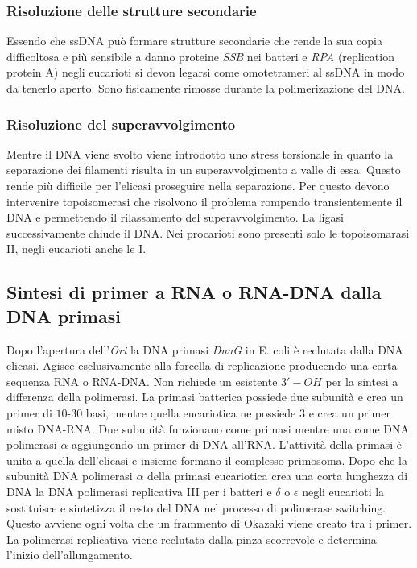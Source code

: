 \subsubsection{Risoluzione delle strutture secondarie}
Essendo che ssDNA pu\`o formare strutture secondarie che rende la sua copia difficoltosa e pi\`u sensibile a danno proteine \emph{SSB} nei batteri e \emph{RPA} (replication protein A) 
negli eucarioti si devon legarsi come omotetrameri al ssDNA in modo da tenerlo aperto. Sono fisicamente rimosse durante la polimerizazione del DNA. 
\subsubsection{Risoluzione del superavvolgimento}
Mentre il DNA viene svolto viene introdotto uno stress torsionale in quanto la separazione dei filamenti risulta in un superavvolgimento a valle di essa. Questo rende pi\`u difficile 
per l'elicasi proseguire nella separazione. Per questo devono intervenire topoisomerasi che risolvono il problema rompendo transientemente il DNA e permettendo il rilassamento del 
superavvolgimento. La ligasi successivamente chiude il DNA. Nei procarioti sono presenti solo le topoisomarasi II, negli eucarioti anche le I. 
\subsection{Sintesi di primer a RNA o RNA-DNA dalla DNA primasi}
Dopo l'apertura dell'\emph{Ori} la DNA primasi \emph{DnaG} in E. coli \`e reclutata dalla DNA elicasi. Agisce esclusivamente alla forcella di replicazione producendo una corta sequenza
RNA o RNA-DNA. Non richiede un esistente $3'-OH$ per la sintesi a differenza della polimerasi. La primasi batterica possiede due subunit\`a e crea un primer di $10$-$30$ basi, mentre 
quella eucariotica ne possiede $3$ e crea un primer misto DNA-RNA. Due subunit\`a funzionano come primasi mentre una come DNA polimerasi $\alpha$ aggiungendo un primer di DNA 
all'RNA. L'attivit\`a della primasi \`e unita a quella dell'elicasi e insieme formano il complesso primosoma. Dopo che la subunit\`a DNA polimerasi $\alpha$ della primasi eucariotica
crea una corta lunghezza di DNA la DNA polimerasi replicativa III per i batteri e $\delta$ o $\epsilon$ negli eucarioti la sostituisce e sintetizza il resto del DNA nel processo di 
polimerase switching. Questo avviene ogni volta che un frammento di Okazaki viene creato tra i primer. La polimerasi replicativa viene reclutata dalla pinza scorrevole e determina 
l'inizio dell'allungamento. 
